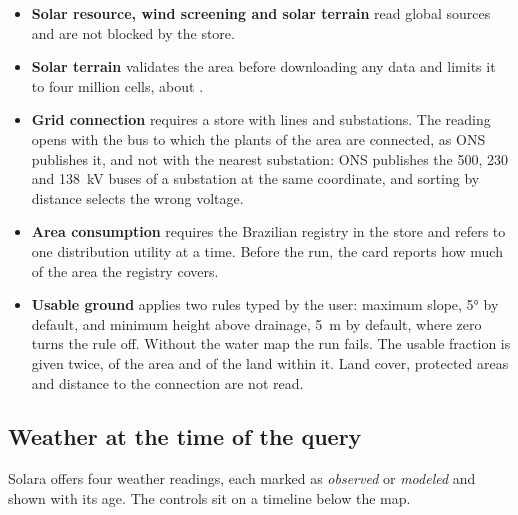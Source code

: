 \documentclass[10pt,a4paper,oneside]{article}
\begin{document}
\begin{itemize}
  \item \textbf{Solar resource, wind screening and solar terrain} read global
    sources and are not blocked by the store.
  \item \textbf{Solar terrain} validates the area before downloading any data
    and limits it to four million cells, about .
  \item \textbf{Grid connection} requires a store with lines and substations.
    The reading opens with the bus to which the plants of the area are
    connected, as ONS publishes it, and not with the nearest substation: ONS
    publishes the 500, 230 and \qty{138}{\kilo\volt} buses of a substation at
    the same coordinate, and sorting by distance selects the wrong voltage.
  \item \textbf{Area consumption} requires the Brazilian registry in the
    store and refers to one distribution utility at a time. Before the run,
    the card reports how much of the area the registry covers.
  \item \textbf{Usable ground} applies two rules typed by the user: maximum
    slope, \ang{5} by default, and minimum height above drainage,
    \qty{5}{\metre} by default, where zero turns the rule off. Without the
    water map the run fails. The usable fraction is given twice, of the area
    and of the land within it. Land cover, protected areas and distance to
    the connection are not read.
\end{itemize}

\subsection{Weather at the time of the query}
\label{sec:tempo}

Solara offers four weather readings, each marked as \emph{observed} or
\emph{modeled} and shown with its age. The controls sit on a timeline below
the map.
\end{document}
